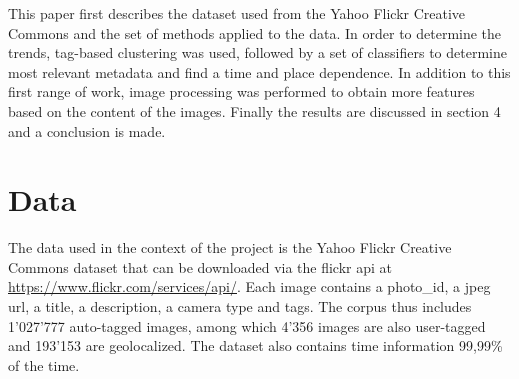 \documentclass[sigconf]{acmart}
\begin{document}
This paper first describes the dataset used from the Yahoo Flickr Creative Commons and the set of methods applied to the data. In order to determine the trends, tag-based clustering was used, followed by a set of classifiers to determine most relevant metadata and find a time and place dependence. In addition to this first range of work, image processing was performed to obtain more features based on the content of the images. Finally the results are discussed in section 4 and a conclusion is made.

\section{Data}
The data used in the context of the project is the Yahoo Flickr Creative Commons dataset that can be downloaded via the flickr api at \url{https://www.flickr.com/services/api/}. Each image contains a photo\_id, a jpeg url, a title, a description, a camera type and tags. The corpus thus includes 1'027'777 auto-tagged images, among which 4'356  images are also user-tagged and 193'153 are geolocalized. The dataset also contains time information 99,99\% of the time.




\end{document}
